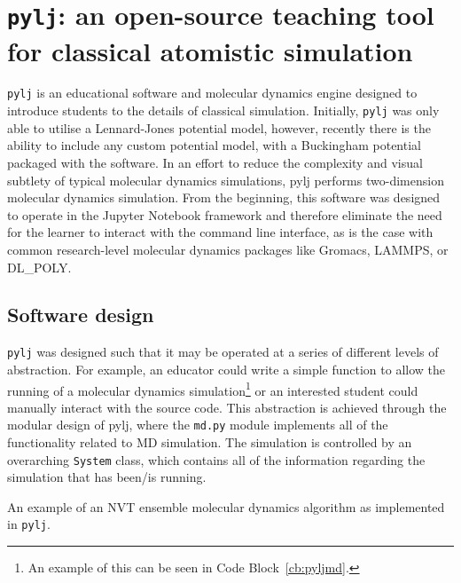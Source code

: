 \section{\texttt{pylj}: an open-source teaching tool for classical atomistic simulation}

\texttt{pylj}\autocite[PYthon Lennard-Jones]{mccluskey_pylj_2018,mccluskey_arm61/pylj_2019-2} is an educational software and molecular dynamics engine designed to introduce students to the details of classical simulation.
Initially, \texttt{pylj} was only able to utilise a Lennard-Jones potential model,\autocite{lennard-jones_determination_1924} however, recently\autocite{mccluskey_arm61/pylj_2018} there is the ability to include any custom potential model, with a Buckingham potential packaged with the software.\autocite{buckingham_classical_1938}
In an effort to reduce the complexity and visual subtlety of typical molecular dynamics simulations, pylj performs two-dimension molecular dynamics simulation.
From the beginning, this software was designed to operate in the Jupyter Notebook framework and therefore eliminate the need for the learner to interact with the command line interface, as is the case with common research-level molecular dynamics packages like Gromacs, LAMMPS, or DL\_POLY.\autocite{berendsen_gromacs_1995,plimpton_fast_1995,smith_dl_poly_2002}

\subsection{Software design}
\texttt{pylj} was designed such that it may be operated at a series of different levels of abstraction.
For example, an educator could write a simple function to allow the running of a molecular dynamics simulation\footnote{An example of this can be seen in Code Block~\ref{cb:pyljmd}.} or an interested student could manually interact with the source code.
This abstraction is achieved through the modular design of pylj, where the \texttt{md.py} module implements all of the functionality related to MD simulation.
The simulation is controlled by an overarching \texttt{System} class, which contains all of the information regarding the simulation that has been/is running.
%
\begin{listing}
    \centering
    \caption{An example of an NVT ensemble molecular dynamics algorithm as implemented in \texttt{pylj}.}
    
    \label{cb:pyljmd}
\end{listing}
%

